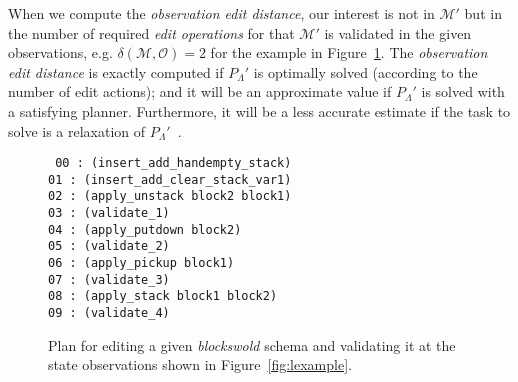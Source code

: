 \documentclass{article}
\begin{document}
When we compute the {\em observation edit distance}, our interest is not in $\mathcal{M}'$ but in the number of required {\em edit operations} for that $\mathcal{M}'$ is validated in the given observations, e.g. $\delta(\mathcal{M},\mathcal{O})=2$ for the example in Figure~\ref{fig:plan}. The {\em observation edit distance} is exactly computed if $P_{\Lambda}'$ is optimally solved (according to the number of edit actions); and it will be an approximate value if $P_{\Lambda}'$ is solved with a satisfying planner. Furthermore, it will be a less accurate estimate if the task to solve is a relaxation of $P_{\Lambda}'$~\cite{bonet2001planning}.
\begin{figure}
{\tt\small
00 : (insert\_add\_handempty\_stack)\\
01 : (insert\_add\_clear\_stack\_var1)\\
02 : (apply\_unstack block2 block1)\\
03 : (validate\_1)\\
04 : (apply\_putdown block2)\\
05 : (validate\_2)\\
06 : (apply\_pickup block1)\\
07 : (validate\_3)\\
08 : (apply\_stack block1 block2)\\
09 : (validate\_4)\\
}
 \caption{\small Plan for editing a given {\em blockswold} schema and validating it at the state observations shown in Figure~\ref{fig:lexample}.}
\label{fig:plan}
\end{figure}
\end{document}
